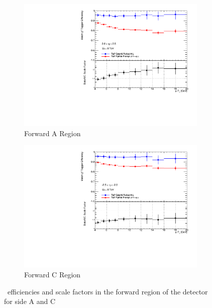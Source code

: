 \begin{figure}[tbhp]
  \centering
  \begin{subfigure}[b]{0.85\textwidth}
    \includegraphics[width=\textwidth]{PartCalibration2012/Plots/SFPlots/Forward_A_smt.pdf}
    \caption{Forward A Region} \label{fig:CalibrationScaleFactorForwardA}
  \end{subfigure}
  
  \begin{subfigure}[b]{0.85\textwidth}
    \includegraphics[width=\textwidth]{PartCalibration2012/Plots/SFPlots/Forward_C_smt.pdf}
    \caption{Forward C Region} \label{fig:CalibrationScaleFactorForwardC}
  \end{subfigure}
  \caption{\xsm\ efficiencies and scale factors in the forward region of the detector for side  A and  C} \label{fig:CalibrationScaleFactorForward}
\end{figure}

